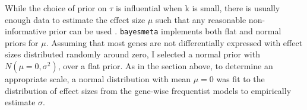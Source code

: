 While the choice of prior on $\tau$ is influential when k is small, there is usually enough data to estimate the effect size $\mu$ such that any reasonable non-informative prior can be used \autocite{gelman2006PriorDistributionsVariance,friede2017MetaanalysisFewSmall}.
\texttt{bayesmeta} implements both flat and normal priors for $\mu$.
%
Assuming that most genes are not differentially expressed with effect sizes distributed randomly around zero, I selected a normal prior with $N(\mu=0, \sigma^2)$, over a flat prior. As in the section above, to determine an appropriate scale, a normal distribution with mean $\mu = 0$ was fit to the distribution of effect sizes from the gene-wise frequentist models to empirically estimate $\sigma$.

